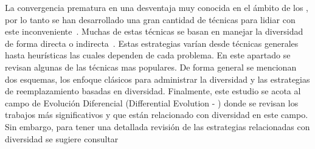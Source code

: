 



La convergencia prematura en una desventaja muy conocida en el ámbito de los \EAS{}, por lo tanto se han desarrollado una gran cantidad de técnicas para lidiar con este inconveniente~\cite{pandey2014comparative}.
%
Muchas de estas técnicas se basan en manejar la diversidad de forma directa o indirecta~\cite{Joel:Crepinsek}.
%
Estas estrategias varían desde técnicas generales hasta heurísticas las cuales dependen de cada problema.
%
En este apartado se revisan algunas de las técnicas mas populares.
%
De forma general se mencionan dos esquemas, los enfoque clásicos para administrar la diversidad y las estrategias de reemplazamiento basadas en diversidad.
%
Finalmente, este estudio se acota al campo de Evolución Diferencial (Differential Evolution - \DE{}) donde se revisan los trabajos más significativos y que están relacionado con diversidad en este campo.
%
Sin embargo, para tener una detallada revisión de las estrategias relacionadas con diversidad se sugiere consultar~\cite{Joel:Crepinsek}
%

